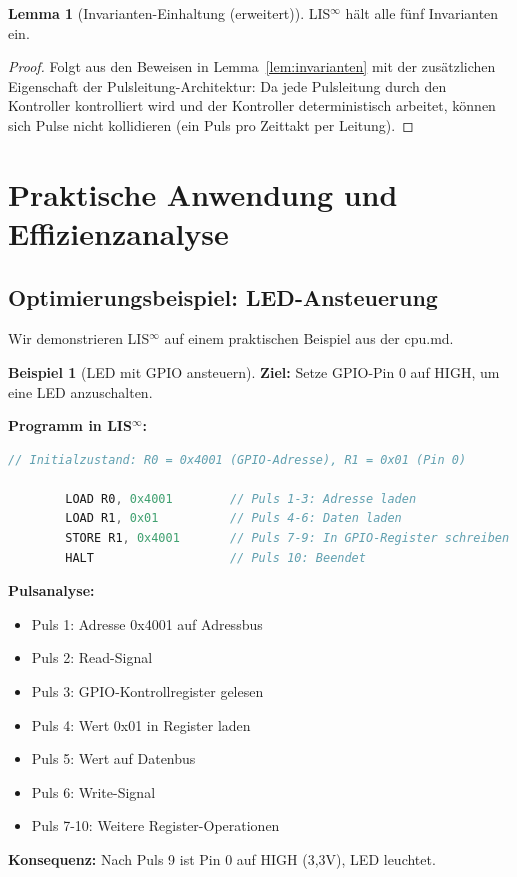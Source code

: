 \documentclass[a4paper,12pt]{article}
\theoremstyle{definition}
\newtheorem{beispiel}{Beispiel}
\newtheorem{lemma}{Lemma}
\begin{document}
	\begin{lemma}[Invarianten-Einhaltung (erweitert)]
		\label{lem:invarianten_erweitert}
		LIS$^{\infty}$ hält alle fünf Invarianten ein.
	\end{lemma}
	
	\begin{proof}
		Folgt aus den Beweisen in Lemma~\ref{lem:invarianten} mit der zusätzlichen Eigenschaft der Pulsleitung-Architektur: Da jede Pulsleitung durch den Kontroller kontrolliert wird und der Kontroller deterministisch arbeitet, können sich Pulse nicht kollidieren (ein Puls pro Zeittakt per Leitung).
	\end{proof}
	
	\section{Praktische Anwendung und Effizienzanalyse}
	\label{sec:praktische_anwendung}
	
	\subsection{Optimierungsbeispiel: LED-Ansteuerung}
	
	Wir demonstrieren LIS$^{\infty}$ auf einem praktischen Beispiel aus der cpu.md.
	
	\begin{beispiel}[LED mit GPIO ansteuern]
		\label{bsp:led_gpio}
		\textbf{Ziel:} Setze GPIO-Pin 0 auf HIGH, um eine LED anzuschalten.
		
		\textbf{Programm in LIS$^{\infty}$:}
		\begin{lstlisting}[language=C]
		// Initialzustand: R0 = 0x4001 (GPIO-Adresse), R1 = 0x01 (Pin 0)
		
		LOAD R0, 0x4001        // Puls 1-3: Adresse laden
		LOAD R1, 0x01          // Puls 4-6: Daten laden
		STORE R1, 0x4001       // Puls 7-9: In GPIO-Register schreiben
		HALT                   // Puls 10: Beendet
		\end{lstlisting}
		
		\textbf{Pulsanalyse:}
		\begin{itemize}
			\item Puls 1: Adresse 0x4001 auf Adressbus
			\item Puls 2: Read-Signal
			\item Puls 3: GPIO-Kontrollregister gelesen
			\item Puls 4: Wert 0x01 in Register laden
			\item Puls 5: Wert auf Datenbus
			\item Puls 6: Write-Signal
			\item Puls 7-10: Weitere Register-Operationen
		\end{itemize}
		
		\textbf{Konsequenz:} Nach Puls 9 ist Pin 0 auf HIGH (3,3V), LED leuchtet.
	\end{beispiel}
	
\end{document}
